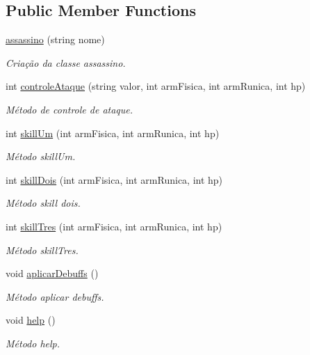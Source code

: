 \subsection*{Public Member Functions}
\begin{DoxyCompactItemize}
\item 
\mbox{\hyperlink{classassassino_a107c275bfe816f79279ec3976223974f}{assassino}} (string nome)
\begin{DoxyCompactList}\small\item\em Criação da classe assassino. \end{DoxyCompactList}\item 
int \mbox{\hyperlink{classassassino_a3f46fb60f6617502542fe7377a6499ab}{controle\+Ataque}} (string valor, int arm\+Fisica, int arm\+Runica, int hp)
\begin{DoxyCompactList}\small\item\em Método de controle de ataque. \end{DoxyCompactList}\item 
int \mbox{\hyperlink{classassassino_a02ee2eea7a7f1ca7ca8d1b88e481ab97}{skill\+Um}} (int arm\+Fisica, int arm\+Runica, int hp)
\begin{DoxyCompactList}\small\item\em Método skill\+Um. \end{DoxyCompactList}\item 
int \mbox{\hyperlink{classassassino_acd757ef4b59c18d2aa504a6afa15b107}{skill\+Dois}} (int arm\+Fisica, int arm\+Runica, int hp)
\begin{DoxyCompactList}\small\item\em Método skill dois. \end{DoxyCompactList}\item 
int \mbox{\hyperlink{classassassino_ad13d3c24ad8f2f3e0c7274a1a18a0d39}{skill\+Tres}} (int arm\+Fisica, int arm\+Runica, int hp)
\begin{DoxyCompactList}\small\item\em Método skill\+Tres. \end{DoxyCompactList}\item 
void \mbox{\hyperlink{classassassino_a283e61020246d2bec61fe8e661a412e9}{aplicar\+Debuffs}} ()
\begin{DoxyCompactList}\small\item\em Método aplicar debuffs. \end{DoxyCompactList}\item 
void \mbox{\hyperlink{classassassino_ae30c9da40ed8c746aa71e784fe20890d}{help}} ()
\begin{DoxyCompactList}\small\item\em Método help. \end{DoxyCompactList}\end{DoxyCompactItemize}


